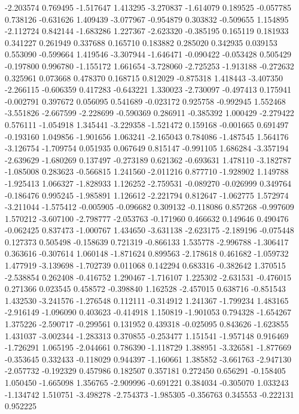 -2.203574
0.769495
-1.517647
1.413295
-3.270837
-1.614079
0.189525
-0.057785
0.738126
-0.631626
1.409439
-3.077967
-0.954879
0.303832
-0.509655
1.154895
-2.112724
0.842144
-1.683286
1.227367
-2.623320
-0.385195
0.165119
0.181933
0.341227
0.261949
0.337688
0.165710
0.183882
0.285020
0.342935
0.039153
0.553090
-0.599664
1.419546
-3.307944
-1.646471
-0.090422
-0.053428
0.505429
-0.197800
0.996780
-1.155172
1.661654
-3.728060
-2.725253
-1.913188
-0.272632
0.325961
0.073668
0.478370
0.168715
0.812029
-0.875318
1.418443
-3.407350
-2.266115
-0.606359
0.417283
-0.643221
1.330023
-2.730097
-0.497413
0.175941
-0.002791
0.397672
0.056095
0.541689
-0.023172
0.925758
-0.992945
1.552468
-3.551826
-2.667599
-2.228699
-0.590369
0.286911
-0.385392
1.000429
-2.279422
0.576111
-1.054918
1.345441
-3.229358
-1.521472
0.159168
-0.001665
0.691497
-0.193160
1.049856
-1.901656
1.063241
-2.165043
0.784086
-1.487545
1.564176
-3.126754
-1.709754
0.051935
0.067649
0.815147
-0.991105
1.686284
-3.357194
-2.639629
-1.680269
0.137497
-0.273189
0.621362
-0.693631
1.478110
-3.182787
-1.085008
0.283623
-0.566815
1.241560
-2.011216
0.877710
-1.928902
1.149788
-1.925413
1.066327
-1.828933
1.126252
-2.759531
-0.089270
-0.026999
0.349764
-0.186476
0.995245
-1.985891
1.126612
-2.221794
0.812647
-1.062775
1.572974
-3.211044
-1.575412
-0.005905
-0.096682
0.309132
-0.118086
0.857268
-0.997609
1.570212
-3.607100
-2.798777
-2.053763
-0.171960
0.466632
0.149646
0.490476
-0.062425
0.837473
-1.000767
1.434650
-3.631138
-2.623175
-2.189196
-0.075448
0.127373
0.505498
-0.158639
0.721319
-0.866133
1.535778
-2.996788
-1.306417
0.363616
-0.307614
1.060148
-1.871624
0.899563
-2.178618
0.461682
-1.059732
1.477919
-3.139698
-1.702739
0.011068
0.142294
0.683316
-0.382642
1.370515
-2.538854
0.262408
-0.416752
1.290467
-1.716107
1.225302
-2.631531
-0.476015
0.271366
0.023545
0.458572
-0.398840
1.162528
-2.457015
0.638716
-0.851543
1.432530
-3.241576
-1.276548
0.112111
-0.314912
1.241367
-1.799234
1.483165
-2.916149
-1.096090
0.403623
-0.414918
1.150819
-1.901053
0.794328
-1.654267
1.375226
-2.590717
-0.299561
0.131952
0.439318
-0.025095
0.843626
-1.623855
1.431037
-3.002344
-1.283313
0.370855
-0.253477
1.151541
-1.957148
0.916469
-1.726291
1.065195
-2.044661
0.786390
-1.118729
1.388951
-3.326581
-1.877669
-0.353645
0.332433
-0.118029
0.944397
-1.160661
1.385852
-3.661763
-2.947130
-2.057732
-0.192329
0.457986
0.182507
0.357181
0.272450
0.656291
-0.158405
1.050450
-1.665098
1.356765
-2.909996
-0.691221
0.384034
-0.305070
1.033243
-1.134742
1.510751
-3.498278
-2.754373
-1.985305
-0.356763
0.345553
-0.222131
0.952225
